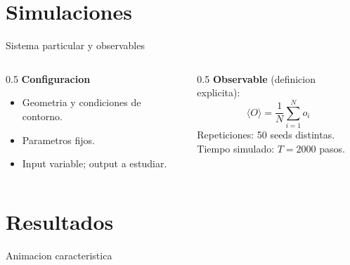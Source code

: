 \documentclass[aspectratio=169]{beamer}
\begin{document}
\section{Simulaciones}
\begin{frame}{Sistema particular y observables}
  \begin{columns}[t]
    \begin{column}{0.5\textwidth}
      \textbf{Configuracion}
      \begin{itemize}
        \item Geometria y condiciones de contorno.
        \item Parametros fijos.
        \item Input variable; output a estudiar.
      \end{itemize}
    \end{column}
    \begin{column}{0.5\textwidth}
      \textbf{Observable} (definicion explicita):
      \begin{equation}
        \langle O \rangle = \frac{1}{N}\sum_{i=1}^{N} o_i
      \end{equation}
      Repeticiones: 50 seeds distintas. \\
      Tiempo simulado: $T = 2000$ pasos.
    \end{column}
  \end{columns}
\end{frame}

\section{Resultados}
\begin{frame}{Animacion caracteristica}
\end{frame}
\end{document}
